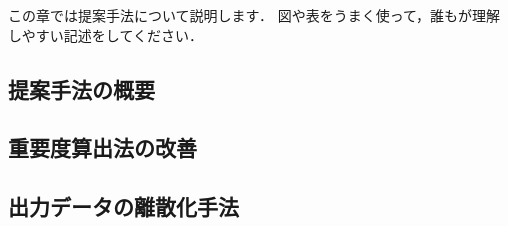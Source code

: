 この章では提案手法について説明します．
図や表をうまく使って，誰もが理解しやすい記述をしてください．

\subsection{提案手法の概要}

\subsection{重要度算出法の改善}

\subsection{出力データの離散化手法}